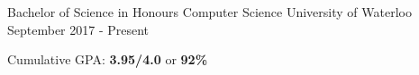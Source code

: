 
\begin{cventries}
  \cventry
    {Bachelor of Science in Honours Computer Science} %
    {University of Waterloo} %
    {} %
    {September 2017 - Present} %
    {
      \begin{cvitems} %
        \item {Cumulative GPA: \textbf{3.95/4.0} or \textbf{92\%}}
      \end{cvitems}
    }
\end{cventries}
